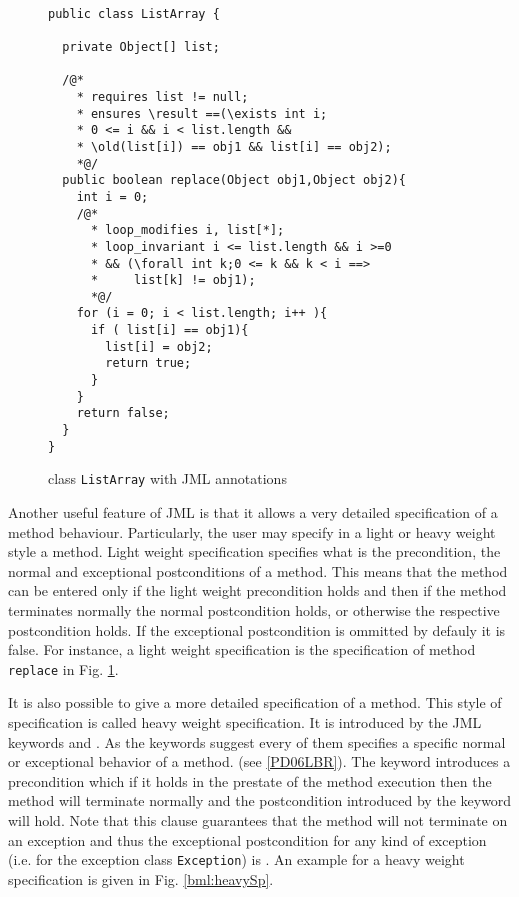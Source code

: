 \begin{figure}[ht!]
\begin{lstlisting}[frame=trbl] 

public class ListArray {

  private Object[] list;

  /@*
    * requires list != null;
    * ensures \result ==(\exists int i; 
    * 0 <= i && i < list.length && 
    * \old(list[i]) == obj1 && list[i] == obj2);
    *@/
  public boolean replace(Object obj1,Object obj2){
    int i = 0;
    /@*
      * loop_modifies i, list[*];
      * loop_invariant i <= list.length && i >=0 
      * && (\forall int k;0 <= k && k < i ==> 
      *     list[k] != obj1);
      *@/
    for (i = 0; i < list.length; i++ ){
      if ( list[i] == obj1){
        list[i] = obj2;
        return true;	
      }
    }
    return false;
  }
}
\end{lstlisting}
\caption{\sc class \mbox{\rm \lstinline!ListArray!} with JML annotations} 
\label{replaceSrc}
\end{figure}



Another useful feature of JML is that it allows a very detailed specification of
a method behaviour. Particularly, the user may specify in a light or heavy weight style a method.
Light weight specification specifies what is the precondition, the normal and exceptional postconditions
of a method. This means that the method can be entered only if the light weight precondition holds and then if the method terminates
normally the normal postcondition holds, or otherwise the respective postcondition holds. If the exceptional postcondition is ommitted by defauly
it is false. For instance, a light weight specification is the specification of method  \texttt{replace}  in Fig. \ref{replaceSrc}.

It is also possible to give a more detailed specification of a method. This style of specification is called heavy weight specification.
 It is introduced by the JML keywords  and . As the keywords
suggest every of them specifies a specific normal or exceptional behavior of a method.  (see \ref{PD06LBR}). The keyword 
  introduces a precondition which if it holds in the prestate of the method execution then
the method will terminate normally and the postcondition introduced by the keyword  will hold.
 Note that this clause guarantees that the method will not terminate on an exception and thus the exceptional postcondition 
for any kind of exception (i.e. for the exception class  \texttt{Exception}) is  .
An example for a heavy weight specification is given in Fig. \ref{bml:heavySp}. 
  
